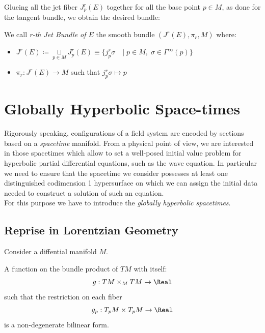 \documentclass[Main]{subfiles}
\begin{document}
		Glueing all the jet fiber $J^r_p (E)$ together for all the base point $p\in M$, as done for the tangent bundle,  we obtain the desired bundle:
		\begin{definition}
			We call \emph{r-th Jet Bundle of $E$} the smooth bundle $(J^r(E), \pi_r, M)$	where:
			\begin{itemize}
				\item $J^r(E) \coloneqq \underset{p \in M}{\sqcup} J^r_p (E)
					 \equiv \big\{j^r_p\sigma \quad \vert \; p\in M, \; \sigma \in \Gamma^\infty(p) \big\}$
				\item $\pi_r: J^r(E) \rightarrow M$ such that $j^{r}_{p}\sigma \mapsto p $
			\end{itemize}
		\end{definition}

	\section{Globally Hyperbolic Space-times}
		Rigorously speaking, configurations of a field system are encoded by sections based on a \emph{spacetime} manifold.
		From a physical point of view, we are interested in those spacetimes which allow to set a well-posed initial value problem for hyperbolic partial differential equations, such as the wave equation.
		 In particular we need to ensure that the spacetime we consider possesses at least one distinguished codimension 1 hypersurface on which we can assign the initial data needed to construct a solution of such an equation.
	 	\\
	 	For this purpose we have to  introduce the \emph{globally hyperbolic spacetimes}.

		\subsection{Reprise in Lorentzian Geometry}
			Consider a diffential manifold $M$.
			
			\begin{definition}
				A function on the bundle product of $TM$ with itself: 
				$$g: TM \times_M TM \rightarrow \Real$$ 
				such that the restriction on each fiber $$g_p: T_pM \times T_pM \rightarrow \Real $$ is a non-degenerate bilinear form.
			\end{definition}
			
\end{document}
